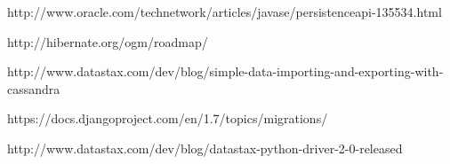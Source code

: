 \begin{thebibliography}{9}
http://www.oracle.com/technetwork/articles/javase/persistenceapi-135534.html

http://hibernate.org/ogm/roadmap/

http://www.datastax.com/dev/blog/simple-data-importing-and-exporting-with-cassandra

https://docs.djangoproject.com/en/1.7/topics/migrations/

http://www.datastax.com/dev/blog/datastax-python-driver-2-0-released

\end{thebibliography}
